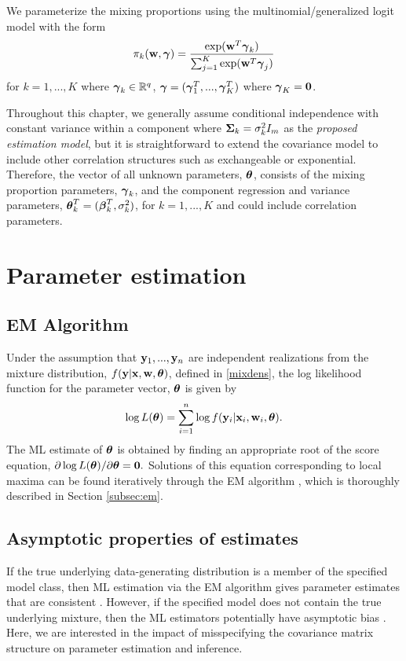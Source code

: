 We parameterize the mixing proportions using the multinomial/generalized logit model with the form
$$\pi_{k}(\mathbf w,\boldsymbol\gamma)=\frac{\exp(\mathbf w^{T}\boldsymbol\gamma_{k})}{\sum_{j=1}^{K}\exp(\mathbf w^{T}\boldsymbol\gamma_{j})}$$ 
for $k=1,...,K$ where $\boldsymbol \gamma_{k}\in\mathbb{R}^{q}$, $\boldsymbol\gamma = (\boldsymbol\gamma_1^T,...,\boldsymbol\gamma_K^T)$ where $\boldsymbol\gamma_{K}=\mathbf 0$.

Throughout this chapter, we generally assume conditional independence with constant variance within a component where $\mathbf\Sigma_{k}=\sigma^{2}_{k}I_{m}$ as the {\em proposed estimation model}, but it is straightforward to extend the covariance model to include other correlation structures such as exchangeable or exponential. Therefore, the vector of all unknown parameters, $\boldsymbol\theta$, consists of the mixing proportion parameters, $\boldsymbol\gamma_{k}$, and the component regression and variance parameters, $\boldsymbol\theta^{T}_{k}=(\boldsymbol\beta^{T}_{k},\sigma^{2}_{k})$, for $k=1,...,K$ and could include correlation parameters.  

\section{Parameter estimation}
\subsection{EM Algorithm}
Under the assumption that $\mathbf y_{1},...,\mathbf y_{n}$ are independent realizations from the mixture distribution, $f(\mathbf y | \mathbf x, \mathbf w, \boldsymbol\theta)$, defined in \ref{mixdens}, the log likelihood function for the parameter vector, $\boldsymbol \theta$ is given by
$$\log L(\boldsymbol\theta)=\sum^{n}_{i=1}\log f(\mathbf y_{i}|\mathbf x_{i},\mathbf w_{i},\boldsymbol \theta).$$
The ML estimate of $\boldsymbol\theta$ is obtained by finding an appropriate root of the score equation, $\partial \log L(\boldsymbol\theta)/\partial \boldsymbol\theta=\mathbf 0.$
Solutions of this equation corresponding to local maxima can be found iteratively through the EM algorithm \cite{dempster1977}, which is thoroughly described in Section \ref{subsec:em}. 

\subsection{Asymptotic properties of estimates}
If the true underlying data-generating distribution is a member of the specified model class, then ML estimation via the EM algorithm gives parameter estimates that are consistent  \cite{wald1949, lecam1953}. However, if the specified model does not contain the true underlying mixture, then the ML estimators potentially have asymptotic bias \cite{gray1994,lo2011}. Here, we are interested in the impact of misspecifying the covariance matrix structure on parameter estimation and inference.

